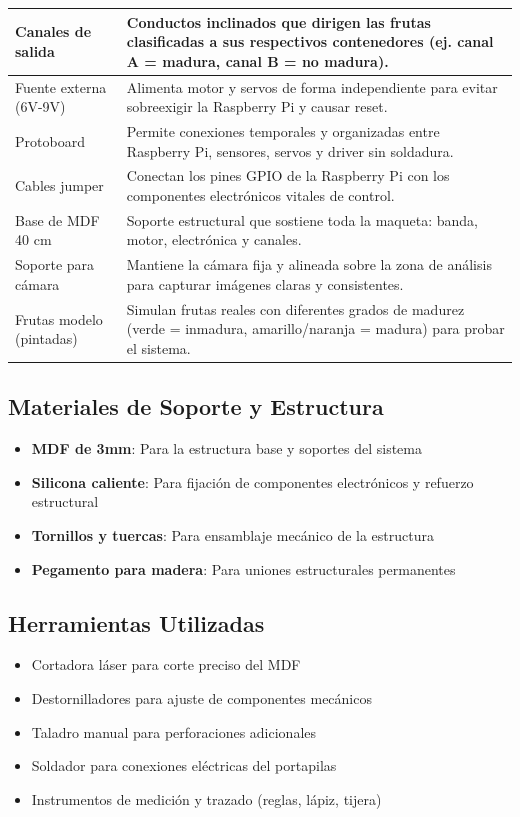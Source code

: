 \begin{table}[H]
\begin{tabular}{|p{}|p{}|}
\hline
Canales de salida & Conductos inclinados que dirigen las frutas clasificadas a sus respectivos contenedores (ej. canal A = madura, canal B = no madura). \\
\hline
Fuente externa (6V-9V) & Alimenta motor y servos de forma independiente para evitar sobreexigir la Raspberry Pi y causar reset. \\
\hline
Protoboard & Permite conexiones temporales y organizadas entre Raspberry Pi, sensores, servos y driver sin soldadura. \\
\hline
Cables jumper & Conectan los pines GPIO de la Raspberry Pi con los componentes electrónicos vitales de control. \\
\hline
Base de MDF 40 cm & Soporte estructural que sostiene toda la maqueta: banda, motor, electrónica y canales. \\
\hline
Soporte para cámara & Mantiene la cámara fija y alineada sobre la zona de análisis para capturar imágenes claras y consistentes. \\
\hline
Frutas modelo (pintadas) & Simulan frutas reales con diferentes grados de madurez (verde = inmadura, amarillo/naranja = madura) para probar el sistema. \\
\hline
\end{tabular}
\end{table}

\subsection{Materiales de Soporte y Estructura}

\begin{itemize}
    \item \textbf{MDF de 3mm}: Para la estructura base y soportes del sistema
    \item \textbf{Silicona caliente}: Para fijación de componentes electrónicos y refuerzo estructural
    \item \textbf{Tornillos y tuercas}: Para ensamblaje mecánico de la estructura
    \item \textbf{Pegamento para madera}: Para uniones estructurales permanentes
\end{itemize}

\subsection{Herramientas Utilizadas}

\begin{itemize}
    \item Cortadora láser para corte preciso del MDF
    \item Destornilladores para ajuste de componentes mecánicos
    \item Taladro manual para perforaciones adicionales
    \item Soldador para conexiones eléctricas del portapilas
    \item Instrumentos de medición y trazado (reglas, lápiz, tijera)
\end{itemize}

